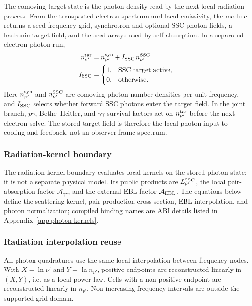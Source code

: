 \documentclass[twocolumn]{aastex702}
\begin{document}
The comoving target state is the photon density read by the next local radiation
process.  From the transported electron spectrum and local emissivity, the module
returns a seed-frequency grid, synchrotron and optional SSC photon fields, a
hadronic target field, and the seed arrays used by self-absorption.  In a
separated electron-photon run,
\begin{equation}
\begin{aligned}
n_{\nu'}^{\rm tar}
&=n_{\nu'}^{\rm syn}
+I_{\rm SSC}\,n_{\nu'}^{\rm SSC},\\
I_{\rm SSC}
&=
\begin{cases}
1, & \text{SSC target active},\\
0, & \text{otherwise}.
\end{cases}
\end{aligned}
\end{equation}
Here \(n_{\nu'}^{\rm syn}\) and \(n_{\nu'}^{\rm SSC}\) are comoving photon number
densities per unit frequency, and \(I_{\rm SSC}\) selects whether forward SSC
photons enter the target field.  In the joint branch, \(p\gamma\),
Bethe--Heitler, and \(\gamma\gamma\) survival factors act on
\(n_{\nu'}^{\rm tar}\) before the next electron solve.  The stored target field is
therefore the local photon input to cooling and feedback, not an observer-frame
spectrum.

\subsubsection{Radiation-kernel boundary}

The radiation-kernel boundary evaluates local kernels on the stored photon state;
it is not a separate physical model.  Its public products are
\(L_{\nu'}^{\rm SSC}\), the local pair-absorption factor
\(\mathcal{A}_{\gamma\gamma}\), and the external EBL factor
\(\mathcal{A}_{\rm EBL}\).  The equations below define the scattering kernel,
pair-production cross section, EBL interpolation, and photon normalization;
compiled binding names are ABI details listed in Appendix~\ref{app:photon-kernels}.

\subsubsection{Radiation interpolation reuse}

All photon quadratures use the same local interpolation between frequency nodes.
With \(X=\ln\nu'\) and \(Y=\ln n_{\nu'}\), positive endpoints are reconstructed
linearly in \((X,Y)\), i.e. as a local power law.  Cells with a non-positive
endpoint are reconstructed linearly in \(n_{\nu'}\).  Non-increasing frequency
intervals are outside the supported grid domain.
\end{document}
